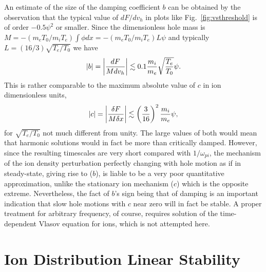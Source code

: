 \documentclass[12pt]{article}
\begin{document}
An estimate of the size of the damping coefficient $b$ can be obtained
by the observation that the typical value of $dF/dv_h$ in plots like
Fig.\ \ref{fig:vsthreshold} is of order $-0.5\psi^2$ or smaller. Since
the dimensionless hole mass is
$M=-(m_eT_0/m_iT_e)\int \phi dx=-(m_eT_0/m_iT_e)L\psi$ and typically
$L=(16/3)\sqrt{T_e/T_0}$ we have
\begin{equation}
  \label{eq:bcoef}
  |b|=\left|dF\over M dv_h\right| \lesssim 0.1{m_i\over m_e}\sqrt{T_e\over T_0}\psi.
\end{equation}
This is rather comparable to the maximum absolute value of $c$ in ion
dimensionless units,
\begin{equation}
  \label{eq:ccoef}
  |c|=\left|\delta F\over M \delta x\right| \lesssim \left(3\over
    16\right)^2{m_i\over m_e} \psi,
\end{equation}
for $\sqrt{T_e/T_0}$ not much different from unity. The large values
of both would mean that harmonic solutions would in fact be more than
critically damped. However, since the resulting timescales are very
short compared with $1/\omega_{pi}$, the mechanism of the ion density
perturbation perfectly changing with hole motion as if in
steady-state, giving rise to ($b$), is liable to be a very poor
quantitative approximation, unlike the stationary ion mechanism ($c$)
which is the opposite extreme. Nevertheless, the fact of $b$'s sign
being that of damping is an important indication that slow hole
motions with $c$ near zero will in fact be stable. A proper treatment
for arbitrary frequency, of course, requires solution of the
time-dependent Vlasov equation for ions, which is not attempted here.

\section{Ion Distribution Linear Stability}\label{sec3}
\end{document}
